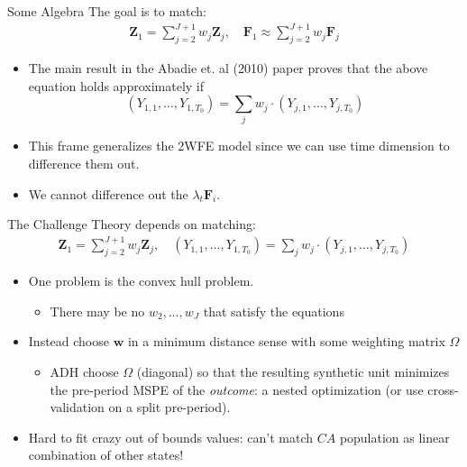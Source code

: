 \documentclass[aspectratio=169,11pt]{beamer}
\begin{document}
\begin{frame}{Some Algebra}
The goal is to match:
\begin{align*}
\mathbf{Z}_{1}= \sum_{j=2}^{J+1} w_{j} \mathbf{Z}_{j}, \quad
\mathbf{F}_{1} \approx \sum_{j=2}^{J+1} w_{j} \mathbf{F}_{j} 
\end{align*}
\begin{itemize}
\item The main result in the Abadie et. al (2010) paper proves that the above equation holds approximately if 
$$\left({Y_{1,1},\ldots, Y_{1,T_0}} \right)= \sum_j w_j \cdot \left({Y_{j,1},\ldots, Y_{j,T_0}} \right)$$
\item This frame generalizes the 2WFE model since we can use time dimension to difference them out.
\item We cannot difference out the $\lambda_t \mathbf{F}_i$.
\end{itemize}
\end{frame}


\begin{frame}{The Challenge}
Theory depends on matching:
\begin{align*}
\mathbf{Z}_{1}= \sum_{j=2}^{J+1} w_{j} \mathbf{Z}_{j}, \quad
\left({Y_{1,1},\ldots, Y_{1,T_0}} \right)= \sum_j w_j \cdot \left({Y_{j,1},\ldots, Y_{j,T_0}} \right)
\end{align*}
\begin{itemize}
\item One problem is the \alert{convex hull} problem. 
\begin{itemize}
\item There may be no $w_2,\ldots,w_J$ that satisfy the equations 
\end{itemize}
\item Instead choose $\mathbf{w}$ in a \alert{minimum distance sense} with some weighting matrix $\Omega$
\begin{itemize}
\item ADH choose $\Omega$ (diagonal) so that the resulting synthetic unit minimizes the pre-period MSPE of the \emph{outcome}: a nested optimization (or use cross-validation on a split pre-period).
\end{itemize}
\item Hard to fit crazy out of bounds values: can't match $CA$ population as linear combination of other states!
\end{itemize}
\end{frame}
\end{document}
